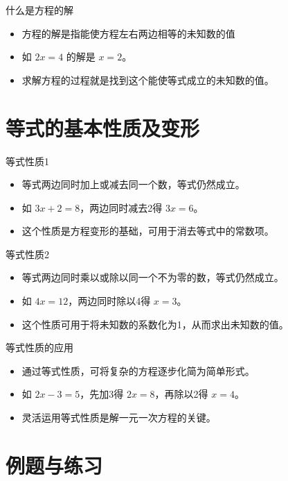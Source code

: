 \documentclass{ctexbeamer}
\begin{document}
\begin{frame}{什么是方程的解}
  \begin{itemize}
    \item 方程的解是指能使方程左右两边相等的未知数的值
    \item 如 \(2x = 4\) 的解是 \(x = 2\)。
    \item 求解方程的过程就是找到这个能使等式成立的未知数的值。
  \end{itemize}
\end{frame}

\section{等式的基本性质及变形}

\begin{frame}{等式性质1}
  \begin{itemize}
    \item 等式两边同时加上或减去同一个数，等式仍然成立。
    \item 如 \(3x + 2 = 8\)，两边同时减去2得 \(3x = 6\)。
    \item 这个性质是方程变形的基础，可用于消去等式中的常数项。
  \end{itemize}
\end{frame}

\begin{frame}{等式性质2}
  \begin{itemize}
    \item 等式两边同时乘以或除以同一个不为零的数，等式仍然成立。
    \item 如 \(4x = 12\)，两边同时除以4得 \(x = 3\)。
    \item 这个性质可用于将未知数的系数化为1，从而求出未知数的值。
  \end{itemize}
\end{frame}

\begin{frame}{等式性质的应用}
  \begin{itemize}
    \item 通过等式性质，可将复杂的方程逐步化简为简单形式。
    \item 如 \(2x - 3 = 5\)，先加3得 \(2x = 8\)，再除以2得 \(x = 4\)。
    \item 灵活运用等式性质是解一元一次方程的关键。
  \end{itemize}
\end{frame}

\section{例题与练习}
\end{document}
